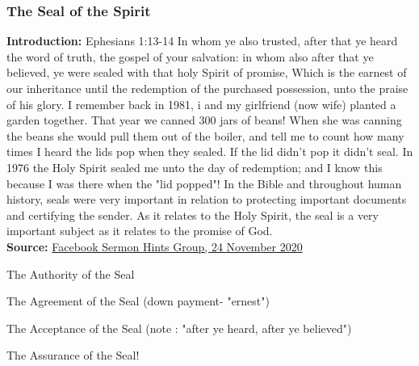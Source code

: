 \subsubsection{The Seal of the Spirit}
\textbf{Introduction:} Ephesians 1:13-14  In whom ye also trusted, after that ye heard the word of truth, the gospel of your salvation: in whom also after that ye believed, ye were sealed with that holy Spirit of promise,
Which is the earnest of our inheritance until the redemption of the purchased possession, unto the praise of his glory.
I remember back in 1981, i and my girlfriend (now wife) planted a garden together. That year we canned 300 jars of beans! When she was canning the beans she would pull them out of the boiler, and tell me to count how many times I heard the lids pop when they sealed. If the lid didn't pop it didn't seal.
In 1976 the Holy Spirit sealed me unto the day of redemption; and I know this because I was there when the "lid popped"! In the Bible and throughout human history, seals were very important in relation to protecting important documents and certifying the sender. As it relates to the Holy Spirit, the seal is a very important subject as it relates to the promise of God.\\
\noindent \textbf{Source:} \href{https://www.facebook.com/groups/sermonhints/posts/2856604397914689}{Facebook Sermon Hints Group, 24 November 2020}

\begin{compactenum}[I.]
    \item The Authority of the Seal
    \item The Agreement of the Seal (down payment- "ernest")
    \item The Acceptance of the Seal (note : "after ye heard, after ye believed")
    \item The Assurance of the Seal!
\end{compactenum}
